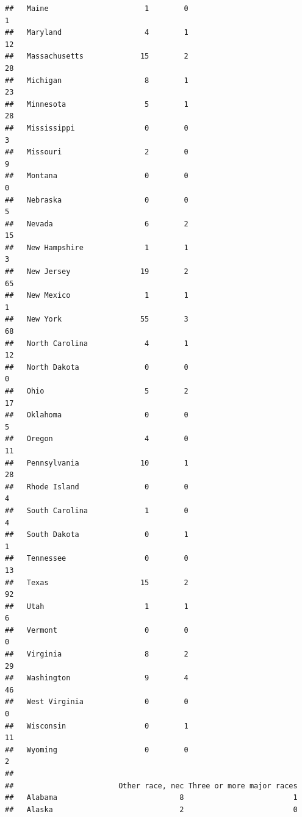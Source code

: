 \documentclass[]{book}
\newenvironment{Shaded}{\begin{snugshade}}{\end{snugshade}}
\theoremstyle{definition}
\theoremstyle{definition}
\theoremstyle{definition}
\theoremstyle{remark}
\begin{document}
\begin{Shaded}
\begin{Highlighting}[]
\begin{Shaded}
\begin{Highlighting}[]
\begin{verbatim}
##   Maine                      1        0                               1
##   Maryland                   4        1                              12
##   Massachusetts             15        2                              28
##   Michigan                   8        1                              23
##   Minnesota                  5        1                              28
##   Mississippi                0        0                               3
##   Missouri                   2        0                               9
##   Montana                    0        0                               0
##   Nebraska                   0        0                               5
##   Nevada                     6        2                              15
##   New Hampshire              1        1                               3
##   New Jersey                19        2                              65
##   New Mexico                 1        1                               1
##   New York                  55        3                              68
##   North Carolina             4        1                              12
##   North Dakota               0        0                               0
##   Ohio                       5        2                              17
##   Oklahoma                   0        0                               5
##   Oregon                     4        0                              11
##   Pennsylvania              10        1                              28
##   Rhode Island               0        0                               4
##   South Carolina             1        0                               4
##   South Dakota               0        1                               1
##   Tennessee                  0        0                              13
##   Texas                     15        2                              92
##   Utah                       1        1                               6
##   Vermont                    0        0                               0
##   Virginia                   8        2                              29
##   Washington                 9        4                              46
##   West Virginia              0        0                               0
##   Wisconsin                  0        1                              11
##   Wyoming                    0        0                               2
##                       
##                        Other race, nec Three or more major races
##   Alabama                            8                         1
##   Alaska                             2                         0

\end{verbatim}
\end{Highlighting}
\end{Shaded}
\end{Highlighting}
\end{Shaded}
\end{document}
